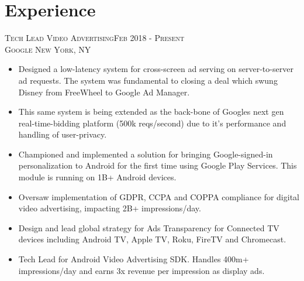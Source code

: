 \section{Experience}

\textsc{Tech Lead Video Advertising\hfill Feb 2018 - Present\\}
\textsc{Google \hfill New York, NY\\}
\begin{itemize}
	\setlength{\itemsep}{1pt}
	\setlength{\parskip}{0pt}
	\setlength{\parsep}{0pt}
	\setlength{\leftmargin}{-5mm}
  \item Designed a low-latency system for cross-screen ad serving on server-to-server ad requests. The system was fundamental to closing a deal which swung Disney from FreeWheel to Google Ad Manager.
  
  \item This same system is being extended as the back-bone of Googles next gen real-time-bidding platform (500k reqs/second) due to it's performance and handling of user-privacy.

  \item Championed and implemented a solution for bringing Google-signed-in personalization to Android for the first time using Google Play Services. This module is running on 1B+ Android devices.

  \item Oversaw implementation of GDPR, CCPA and COPPA compliance for digital video advertising, impacting 2B+ impressions/day.

  \item Design and lead global strategy for Ads Transparency for Connected TV devices including Android TV, Apple TV, Roku, FireTV and Chromecast.

  \item Tech Lead for Android Video Advertising SDK. Handles 400m+ impressions/day and earns 3x revenue per impression as display ads.






\end{itemize}

